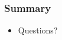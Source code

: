 \begin{frame}
\frametitle{Summary}

\begin{itemize}
\item Questions?
\end{itemize}



\end{frame}


